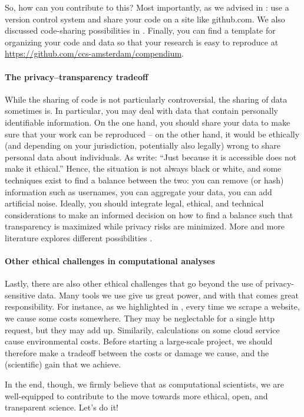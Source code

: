 So, how can you contribute to this? Most importantly, as we advised in : use a version control system
and share your code on a site like github.com. We also discussed code-sharing possibilities in . Finally, you can find a template for organizing your code and data so that your
research is easy to reproduce at \url{https://github.com/ccs-amsterdam/compendium}. 

\paragraph{The privacy--transparency tradeoff} While the sharing of code is not particularly controversial, the sharing of
data sometimes is. In particular, you may deal with data that contain personally identifiable information. On the one
hand, you should share your data to make sure that your work can be reproduced -- on the other hand, it would be ethically
(and depending on your jurisdiction, potentially also legally) wrong to share personal data about individuals.
As \cite{boyd2012} write: ``Just because it is accessible does not make it ethical.'' Hence, the
situation is not always black or white, and some techniques exist to find a balance between the two: you can remove
(or hash) information such as usernames, you can aggregate your data, you can add artificial noise. Ideally, you should
integrate legal, ethical, and technical considerations to make an informed decision on how to find a balance such that
transparency is maximized while privacy risks are minimized. More and more literature explores different possibilities \cite[e.g.][]{Breuer2020}.


\paragraph{Other ethical challenges in computational analyses} 
Lastly, there are also other ethical challenges that go beyond the use of privacy-sensitive data. Many tools we
use give us great power, and with that comes great responsibility. For instance, as we highlighted in
, every time we scrape a website, we cause some costs somewhere. They may be
neglectable for a single http request, but they may add up. Similarily, calculations on some cloud service
cause environmental costs. Before starting a large-scale project, we should therefore make a tradeoff between
the costs or damage we cause, and the (scientific) gain that we achieve.

In the end, though, we firmly believe that as computational scientists, we are well-equipped to contribute to the move towards
more ethical, open, and transparent science. Let's do it!
